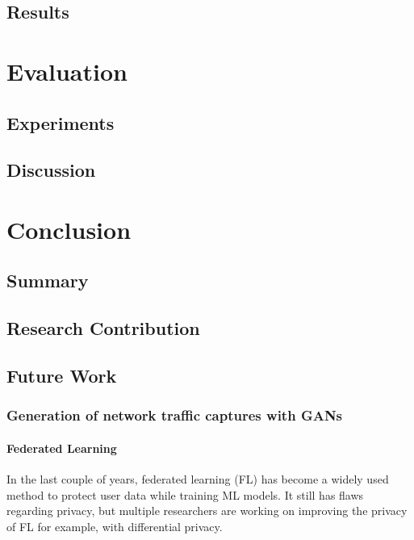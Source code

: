 \documentclass[
	ngerman,
	ruledheaders=section,%
	class=report,%
	thesis={type=bachelor},%
	accentcolor=9c,%
	custommargins=true,%
	marginpar=false,%
	parskip=half-,%
	fontsize=11pt,%
]{tudapub}
\begin{document}
\section{Results}

\chapter{Evaluation}

\section{Experiments}

\section{Discussion}

\chapter{Conclusion}


\section{Summary}

\section{Research Contribution}

\section{Future Work}

\subsection{Generation of network traffic captures with GANs}

\subsubsection{Federated Learning}

In the last couple of years, federated learning (FL) has become a widely used method to protect user data while training ML models.
It still has flaws regarding privacy, but multiple researchers are working on improving the privacy of FL for example, with differential privacy.
\end{document}
